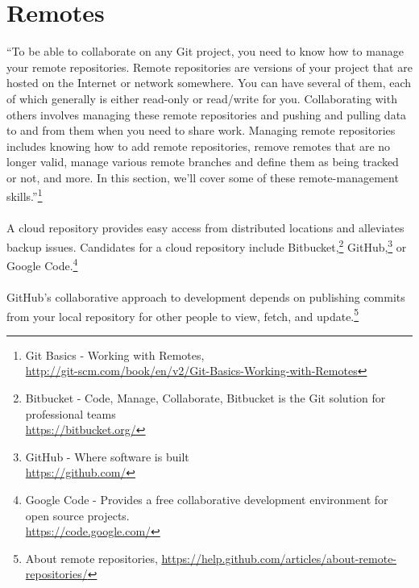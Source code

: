 
\newpage
\section{Remotes}
``To be able to collaborate on any Git project, you need to know
how to manage your remote repositories.  Remote repositories are
versions of your project that are hosted on the Internet or
network somewhere.  You can have several of them, each of which
generally is either read-only or read/write for you.
Collaborating with others involves managing these remote
repositories and pushing and pulling data to and from them when
you need to share work.  Managing remote repositories includes
knowing how to add remote repositories, remove remotes that are no
longer valid, manage various remote branches and define them as
being tracked or not, and more. In this section, we'll cover some
of these remote-management skills.''\footnote{Git Basics - Working
with Remotes,\\
\href{http://git-scm.com/book/en/v2/Git-Basics-Working-with-Remotes}{http://git-scm.com/book/en/v2/Git-Basics-Working-with-Remotes}}
\\
\\
A cloud repository provides easy access from distributed
locations and alleviates backup issues.  Candidates for
a cloud repository include Bitbucket,\footnote{Bitbucket - Code, Manage, Collaborate,
Bitbucket is the Git solution for professional teams\\
\href{https://bitbucket.org/}{https://bitbucket.org/}}
GitHub,\footnote{GitHub - Where software is built\\
\href{https://github.com/}{https://github.com/}}
or Google Code.\footnote{Google Code - Provides a free collaborative development environment
for open source projects.\\
\href{https://code.google.com/}{https://code.google.com/}}
\\
\\
\noindent GitHub's collaborative approach to development depends on
publishing commits from your local repository for other people to
view, fetch, and update.\footnote{About remote repositories,
\href{https://help.github.com/articles/about-remote-repositories/}{https://help.github.com/articles/about-remote-repositories/}}
